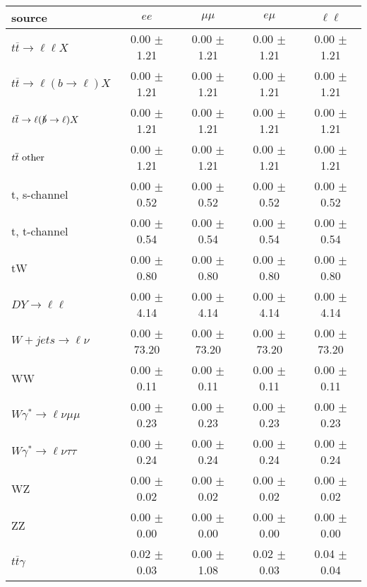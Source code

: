 \begin{tabular}{l|cccc} \hline\hline
source & $ee$ & $\mu\mu$ & $e\mu$ & $\ell\ell $ \\
\hline
$t\overline{t} \rightarrow \ell \ell X$ &  0.00 $\pm$  1.21 &  0.00 $\pm$  1.21 &  0.00 $\pm$  1.21 &  0.00 $\pm$  1.21 \\
$t\overline{t} \rightarrow \ell (b \rightarrow \ell) X$ &  0.00 $\pm$  1.21 &  0.00 $\pm$  1.21 &  0.00 $\pm$  1.21 &  0.00 $\pm$  1.21 \\
$t\overline{t} \rightarrow \ell (\slashed b \rightarrow \ell) X$ &  0.00 $\pm$  1.21 &  0.00 $\pm$  1.21 &  0.00 $\pm$  1.21 &  0.00 $\pm$  1.21 \\
        $t\overline{t}\ \rm{other}$ &  0.00 $\pm$  1.21 &  0.00 $\pm$  1.21 &  0.00 $\pm$  1.21 &  0.00 $\pm$  1.21 \\
\hline
                       t, s-channel &  0.00 $\pm$  0.52 &  0.00 $\pm$  0.52 &  0.00 $\pm$  0.52 &  0.00 $\pm$  0.52 \\
                       t, t-channel &  0.00 $\pm$  0.54 &  0.00 $\pm$  0.54 &  0.00 $\pm$  0.54 &  0.00 $\pm$  0.54 \\
                                 tW &  0.00 $\pm$  0.80 &  0.00 $\pm$  0.80 &  0.00 $\pm$  0.80 &  0.00 $\pm$  0.80 \\
\hline
         $DY \rightarrow \ell \ell$ &  0.00 $\pm$  4.14 &  0.00 $\pm$  4.14 &  0.00 $\pm$  4.14 &  0.00 $\pm$  4.14 \\
      $W+jets \rightarrow \ell \nu$ &  0.00 $\pm$ 73.20 &  0.00 $\pm$ 73.20 &  0.00 $\pm$ 73.20 &  0.00 $\pm$ 73.20 \\
                                 WW &  0.00 $\pm$  0.11 &  0.00 $\pm$  0.11 &  0.00 $\pm$  0.11 &  0.00 $\pm$  0.11 \\
\hline
$W\gamma^{*} \rightarrow \ell \nu \mu\mu$ &  0.00 $\pm$  0.23 &  0.00 $\pm$  0.23 &  0.00 $\pm$  0.23 &  0.00 $\pm$  0.23 \\
$W\gamma^{*} \rightarrow \ell \nu \tau\tau$ &  0.00 $\pm$  0.24 &  0.00 $\pm$  0.24 &  0.00 $\pm$  0.24 &  0.00 $\pm$  0.24 \\
                                 WZ &  0.00 $\pm$  0.02 &  0.00 $\pm$  0.02 &  0.00 $\pm$  0.02 &  0.00 $\pm$  0.02 \\
                                 ZZ &  0.00 $\pm$  0.00 &  0.00 $\pm$  0.00 &  0.00 $\pm$  0.00 &  0.00 $\pm$  0.00 \\
\hline
              $t\overline{t}\gamma$ &  0.02 $\pm$  0.03 &  0.00 $\pm$  1.08 &  0.02 $\pm$  0.03 &  0.04 $\pm$  0.04 \\

\end{tabular}

